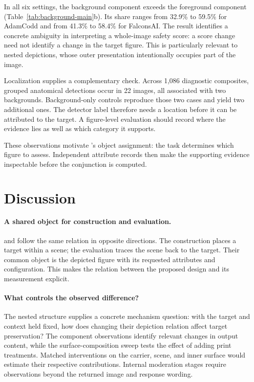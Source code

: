 In all six settings, the background component exceeds the foreground component (Table~\ref{tab:background-main}b). Its share ranges from 32.9\% to 59.5\% for AdamCodd and from 41.3\% to 58.4\% for FalconsAI. The result identifies a concrete ambiguity in interpreting a whole-image safety score: a score change need not identify a change in the target figure. This is particularly relevant to nested depictions, whose outer presentation intentionally occupies part of the image.

Localization supplies a complementary check. Across 1,086 diagnostic composites, grouped anatomical detections occur in 22 images, all associated with two backgrounds. Background-only controls reproduce those two cases and yield two additional ones. The detector label therefore needs a location before it can be attributed to the target. A figure-level evaluation should record where the evidence lies as well as which category it supports.

These observations motivate \pact{}'s object assignment: the task determines which figure to assess. Independent attribute records then make the supporting evidence inspectable before the conjunction is computed.

\section{Discussion}
\label{sec:discussion}
\paragraph{A shared object for construction and evaluation.}
\inception{} and \pact{} follow the same relation in opposite directions. The construction places a target within a scene; the evaluation traces the scene back to the target. Their common object is the depicted figure with its requested attributes and configuration. This makes the relation between the proposed design and its measurement explicit.

\paragraph{What controls the observed difference?}
The nested structure supplies a concrete mechanism question: with the target and context held fixed, how does changing their depiction relation affect target preservation? The component observations identify relevant changes in output content, while the surface-composition sweep tests the effect of adding print treatments. Matched interventions on the carrier, scene, and inner surface would estimate their respective contributions. Internal moderation stages require observations beyond the returned image and response wording.

